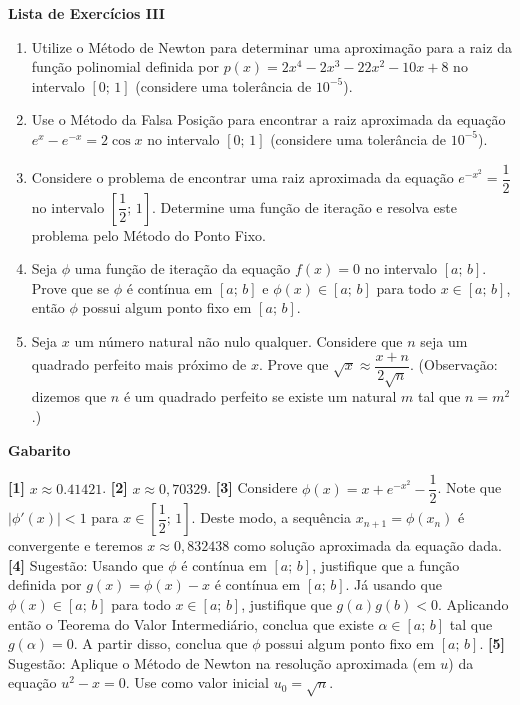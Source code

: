 \documentclass[12pt,a4paper]{article}
\begin{document}
\begin{center}
 \textbf{Lista de Exercícios III}
\end{center}

\begin{enumerate}

 \item Utilize o Método de Newton para determinar uma aproximação para a raiz da função polinomial definida por $p(x) = 2x^4 -2x^3 -22x^2 - 10x + 8$ no intervalo $[0;\,1]$ (considere uma tolerância 
 de $10^{-5}$).
 \item Use o Método da Falsa Posição para encontrar a raiz aproximada da equação $e^{x} - e^{-x} = 2\cos x$ no intervalo $[0;\,1]$ (considere uma tolerância de $10^{-5}$).
 \item Considere o problema de encontrar uma raiz aproximada da equação $e^{-x^2} = \dfrac{1}{2}$ no intervalo $\left[\dfrac{1}{2};\,1\right]$. Determine uma função de iteração e resolva este problema pelo Método do Ponto Fixo.
 \item Seja $\phi$ uma função de iteração da equação $f(x) = 0$ no intervalo $[a;\, b]$. Prove que se $\phi$ é contínua em $[a;\,b]$ e $\phi(x)\in[a;\,b]$ para 
 todo $x\in[a;\, b]$, então $\phi$ possui algum ponto fixo em $[a;\,b]$.
 \item Seja $x$ um número natural não nulo qualquer. Considere que $n$ seja um quadrado perfeito mais próximo de $x$. Prove que $\sqrt{x}\approx \dfrac{x+n}{2\sqrt{n}}$. 
 (Observação: dizemos que $n$ é um quadrado perfeito se existe um natural $m$ tal que $n = m^2$.)

\end{enumerate}

\begin{center}
\textbf{Gabarito}
\end{center}
\textbf{[1]} $x\approx 0.41421$.
\textbf{[2]} $x\approx 0,70329$. 
\textbf{[3]} Considere $\phi(x) = x + e^{-x^2} - \dfrac{1}{2}$. Note que $|\phi'(x)| < 1$ para $x\in\left[\dfrac{1}{2};\,1\right]$. Deste modo, a sequência 
$x_{n+1}=\phi(x_n)$ é convergente e teremos $x\approx 0,832438$ como solução aproximada da equação dada.
\textbf{[4]} Sugestão: Usando que $\phi$ é contínua em $[a;\,b]$, justifique que a função definida por $g(x) = \phi(x) - x$ é contínua em $[a;\,b]$. Já usando que $\phi(x)\in[a;\,b]$ para todo $x\in[a;\,b]$, justifique que $g(a)g(b) < 0$. 
Aplicando então o Teorema do Valor Intermediário, conclua que existe $\alpha\in[a;\,b]$ tal que $g(\alpha)=0$. A partir disso, conclua que $\phi$ possui algum ponto fixo em $[a;\,b]$. 
\textbf{[5]} Sugestão: Aplique o Método de Newton na resolução aproximada (em $u$) da equação $u^2 - x = 0$. Use como valor inicial $u_0 = \sqrt{n}$.
\end{document}
